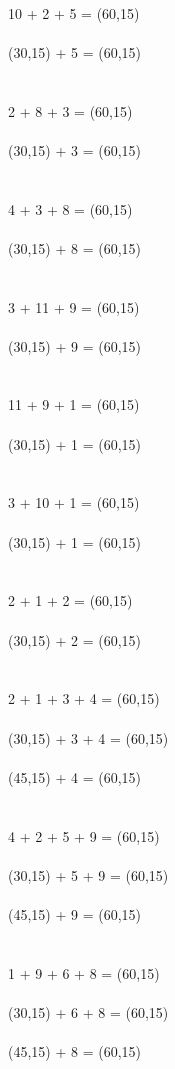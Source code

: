 \documentclass[12pt]{article}
\begin{document}
\\
10 + 2 + 5 = \framebox(60,15){}
\\
\\
\framebox(30,15){} + 5 = \framebox(60,15){}
\\
\\
\\
2 + 8 + 3 = \framebox(60,15){}
\\
\\
\framebox(30,15){} + 3 = \framebox(60,15){}
\\
\\
\\
4 + 3 + 8 = \framebox(60,15){}
\\
\\
\framebox(30,15){} + 8 = \framebox(60,15){}
\\
\\
\\
3 + 11 + 9 = \framebox(60,15){}
\\
\\
\framebox(30,15){} + 9 = \framebox(60,15){}
\\
\\
\\
11 + 9 + 1 = \framebox(60,15){}
\\
\\
\framebox(30,15){} + 1 = \framebox(60,15){}
\\
\\
\\
3 + 10 + 1 = \framebox(60,15){}
\\
\\
\framebox(30,15){} + 1 = \framebox(60,15){}
\\
\\
\\
2 + 1 + 2 = \framebox(60,15){}
\\
\\
\framebox(30,15){} + 2 = \framebox(60,15){}
\\
\\
\\
2 + 1 + 3 + 4 = \framebox(60,15){}
\\
\\
\framebox(30,15){} + 3 + 4 = \framebox(60,15){}
\\
\\
\framebox(45,15){} + 4 = \framebox(60,15){}
\\
\\
\\
4 + 2 + 5 + 9 = \framebox(60,15){}
\\
\\
\framebox(30,15){} + 5 + 9 = \framebox(60,15){}
\\
\\
\framebox(45,15){} + 9 = \framebox(60,15){}
\\
\\
\\
1 + 9 + 6 + 8 = \framebox(60,15){}
\\
\\
\framebox(30,15){} + 6 + 8 = \framebox(60,15){}
\\
\\
\framebox(45,15){} + 8 = \framebox(60,15){}
\end{document}
